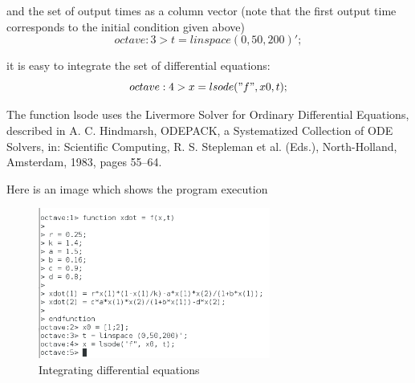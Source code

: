 \documentclass[a4paper,12pt]{article}
\begin{document}
and the set of output times as a column vector (note that the first output time corresponds to the initial condition given above)
\begin{equation}
    \label{simple_equation}
	octave:3> t = linspace (0, 50, 200)';
\end{equation}
\par
it is easy to integrate the set of differential equations:
\begin{equation}
    \label{simple_equation}
	octave:4> x = lsode ("f", x0, t);
\end{equation}
\par
The function lsode uses the Livermore Solver for Ordinary Differential Equations, described in A. C. Hindmarsh, ODEPACK, a Systematized Collection of ODE Solvers, in: Scientific Computing, R. S. Stepleman et al. (Eds.), North-Holland, Amsterdam, 1983, pages 55–64.
\par
Here is an image which shows the program execution
\begin{figure}[H]
    \centering
    \includegraphics[width=3.0in]{img/5.png}
    \caption{Integrating differential equations}
    \label{simulationfigure}
\end{figure}
\end{document}
